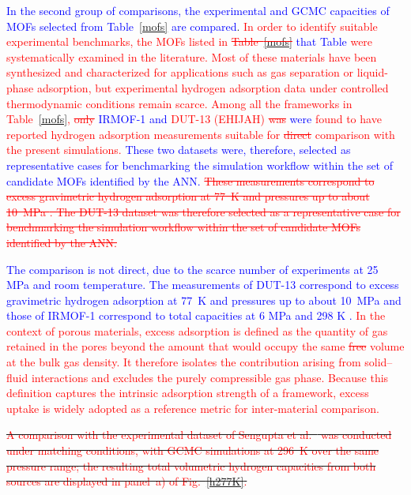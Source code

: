 \documentclass[review]{elsarticle}
\begin{document}
\textcolor{blue}{In the second group of comparisons, the experimental and GCMC 
capacities of MOFs selected from 
Table~\ref{mofs} are compared}. \textcolor{red}{In order to 
identify suitable experimental benchmarks, the MOFs listed in 
\sout{Table~\ref{mofs}} \textcolor{blue}{that Table} were systematically 
examined in the literature. Most of these materials have been synthesized and 
characterized for applications such as gas separation or liquid-phase 
adsorption, but experimental hydrogen adsorption data under controlled 
thermodynamic conditions remain scarce. Among all the frameworks in 
Table~\ref{mofs}, \sout{only} \textcolor{blue}{IRMOF-1 and} DUT-13 (EHIJAH) 
\sout{was} \textcolor{blue}{were} found to have reported hydrogen 
adsorption measurements suitable for \sout{direct} comparison with the present 
simulations. 
\textcolor{blue}{These two datasets were, therefore, selected  
as representative cases for benchmarking the 
simulation workflow within the set of candidate MOFs identified by the ANN.}
\sout{These measurements correspond to excess gravimetric hydrogen 
adsorption at 77~K and pressures up to about 10~MPa \cite{gsbk+11}. The DUT-13 
dataset was therefore selected as a representative case for benchmarking the 
simulation workflow within the set of candidate MOFs identified by the ANN.
}}

\textcolor{blue}{The comparison is not direct, due to the scarce number of 
experiments at 25 MPa and room temperature. The measurements of DUT-13 
correspond to excess gravimetric hydrogen adsorption at 77~K and pressures up 
to about 10~MPa \cite{gsbk+11} and those of IRMOF-1 correspond to total 
capacities at 6 MPa and 298 K \cite{cz07}.}
\textcolor{red}{In the context of porous materials, excess adsorption is 
defined as the quantity of gas retained in the pores beyond the amount that 
would occupy the same \sout{free} volume at the bulk gas density. It therefore 
isolates the contribution arising from solid–fluid interactions and excludes 
the purely compressible gas phase. Because this definition captures the 
intrinsic adsorption strength of a framework, excess uptake is widely adopted 
as a reference metric for inter-material comparison.}

\sout{
\textcolor{red}{A comparison with the experimental dataset of Sengupta et 
al.~\cite{smbd+23} was conducted under matching conditions, with GCMC 
simulations at 296~K over the same pressure range; the 
resulting total volumetric hydrogen capacities from both 
sources are displayed in panel~a) of Fig.~\ref{h277K}.}
}
\end{document}
